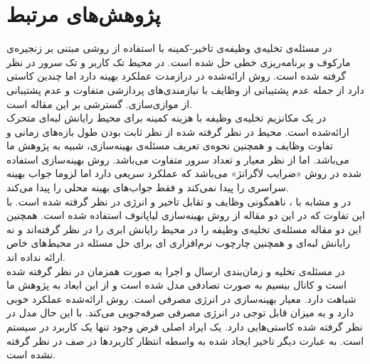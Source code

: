 \section{پژوهش‌های مرتبط}
در \cite{Liu} مسئله‌ی تخلیه‌ی وظیفه‌ی تاخیر-کمینه با استفاده از روشی مبتنی بر زنجیره‌ی مارکوف و برنامه‌ریزی خطی حل شده است. در \CurrentProject محیط تک کاربر و تک سرور در نظر گرفته شده است. روش ارائه‌شده در درازمدت عملکرد بهینه دارد اما چندین کاستی دارد از جمله عدم پشتیبانی از وظایف با نیازمندی‌های پردازشی متفاوت و عدم پشتیبانی از موازی‌سازی. \CurrentProject گسترشی بر این مقاله است. \\

در \cite{samanta} یک مکانزیم تخلیه‌ی وظیفه با هزینه کمینه برای محیط رایانش لبه‌ای متحرک ارائه‌شده است. محیط در نظر گرفته شده از نظر ثابت بودن طول بازه‌های زمانی و تفاوت وظایف و همچنین نحوه‌ی تعریف مسئله‌ی بهینه‌سازی، شبیه به پژوهش ما می‌باشد. اما از نظر معیار و تعداد سرور متفاوت می‌باشد. روش بهینه‌سازی استفاده شده در \CurrentProject روش «ضرایب لاگرانژ» می‌باشد که عملکرد سریعی دارد اما لزوما جواب بهینه سراسری را پیدا نمی‌کند و فقط جواب‌های بهینه محلی را پیدا می‌کند. \\

در \cite{kwak} و \cite{jiang} مشابه با \CurrentProject، ناهمگونی وظایف و تقابل تاخیر و انرژی در نظر گرفته شده است. با این تفاوت که در این دو مقاله از روش بهینه‌سازی لیاپانوف استفاده شده است. همچنین این دو مقاله مسئله‌ی تخلیه‌ی وظیفه را در محیط رایانش ابری را در نظر گرفته‌اند و نه رایانش لبه‌ای و همچنین چارچوب نرم‌افزاری ای برای حل مسئله در محیط‌های خاص ارائه نداده اند. \\

در \cite{zhang2013} مسئله‌ی تخلیه و زمان‌بندی ارسال و اجرا به صورت همزمان در نظر گرفته شده است و کانال بیسیم به صورت تصادفی مدل شده است و از این ابعاد به پژوهش ما شباهت دارد. معیار بهینه‌سازی در \CurrentProject انرژی مصرفی است. روش ارائه‌شده عملکرد خوبی دارد و به میزان قابل توجی در انرژی مصرفی صرفه‌جویی می‌کند. با این حال مدل در نظر گرفته شده کاستی‌هایی دارد. یک ایراد اصلی فرض وجود تنها یک کاربرد در سیستم است. به عبارت دیگر تاخیر ایجاد شده به واسطه انتظار کاربردها در صف در نظر گرفته نشده است.

\clearpage
